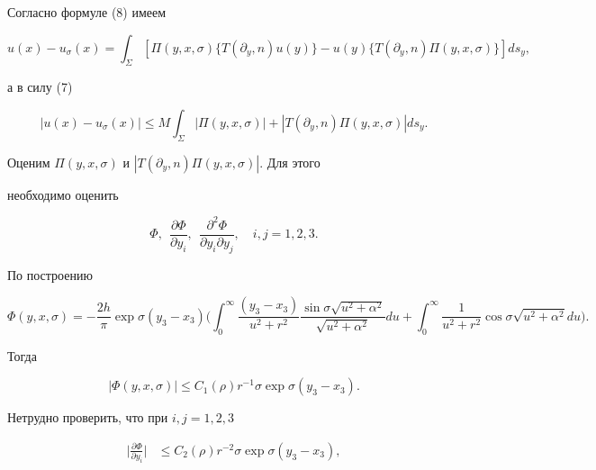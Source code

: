  


\begin{pf} 


Согласно формуле (8) имеем 


$$ 


u(x)-u_\sigma(x)=\int_\Sigma[\Pi(y,x,\sigma)\{T(\partial_y,n)u(y)\}- 


u(y)\{T(\partial_y,n)\Pi(y,x,\sigma)\}]ds_y, 


$$ 


а в силу (7) 


\begin{equation} 


|u(x)-u_\sigma(x)|\le M\int_\Sigma|\Pi(y,x,\sigma)|+ 


|T(\partial_y,n)\Pi(y,x,\sigma)|ds_y. 


\end{equation} 


Оценим $\Pi(y,x,\sigma)$ и $|T(\partial_y,n)\Pi(y,x,\sigma)|$. Для этого 


необходимо оценить 


$$ 


\Phi,\ \ \frac{\partial\Phi}{\partial y_i}, 


\ \ \frac{\partial^2\Phi}{\partial y_i\partial y_j},\quad i,j=1,2,3. 


$$ 


По построению 


$$ 


\Phi(y,x,\sigma)=-\frac{2h}{\pi}\exp\sigma(y_3-x_3)\bigg( 


\int^\infty_0\frac{(y_3-x_3)}{u^2+r^2} 


\frac{\sin\sigma\sqrt{u^2+\alpha^2}}{\sqrt{u^2+\alpha^2}}du+ 


\int^\infty_0\frac{1}{u^2+r^2}\cos\sigma\sqrt{u^2+\alpha^2}du\bigg). 


$$ 


Тогда 


\begin{equation} 


|\Phi(y,x,\sigma)|\le C_1(\rho)r^{-1}\sigma\exp\sigma(y_3-x_3). 


\end{equation} 


Нетрудно проверить, что при $i,j=1,2,3$ 


\begin{align} 


\bigg|\frac{\partial\Phi}{\partial y_i}\bigg|&\le 


C_2(\rho)r^{-2}\sigma\exp\sigma(y_3-x_3),\\ 



\end{align}
\end{pf}
